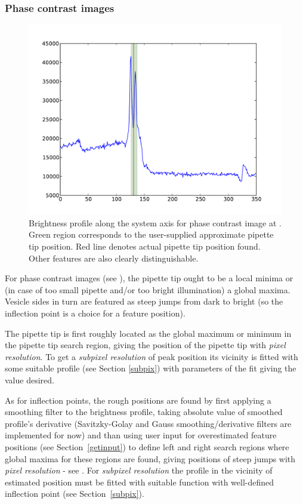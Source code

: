\subsubsection{Phase contrast images}\label{phcfeatures}

\begin{figure}%
\includegraphics[width=\columnwidth]{figs/phcaxisprofile.pdf}%
\caption{Brightness profile along the system axis for phase contrast image at . Green region corresponds to the user-supplied approximate pipette tip position. Red line denotes actual pipette tip position found. Other features are also clearly distinguishable.}%
\label{fig:phcaxisprofile}%
\end{figure}

For phase contrast images (see ), the pipette tip ought to be a local minima or (in case of too small pipette and/or too bright illumination) a global maxima. Vesicle sides in turn are featured as steep jumps from dark to bright (so the inflection point is a choice for a feature position). 

The pipette tip is first roughly located as the global maximum or minimum in the pipette tip search region, giving the position of the pipette tip with \emph{pixel resolution}. To get a \emph{subpixel resolution} of peak position its vicinity is fitted with some suitable profile (see Section \ref{subpix}) with parameters of the fit giving the value desired.

As for inflection points, the rough positions are found by first applying a smoothing filter to the brightness profile, taking absolute value of smoothed profile's derivative (Savitzky-Golay \cite{Savitzky1964, Steinier1972} and Gauss smoothing/derivative filters are implemented for now) and than using user input for overestimated feature positions (see Section~\ref{getinput}) to define left and right search regions where global maxima for these regions are found, giving positions of steep jumps with \emph{pixel resolution} - see . For \emph{subpixel resolution} the profile in the vicinity of estimated position must be fitted with suitable function with well-defined inflection point (see Section~\ref{subpix}).

